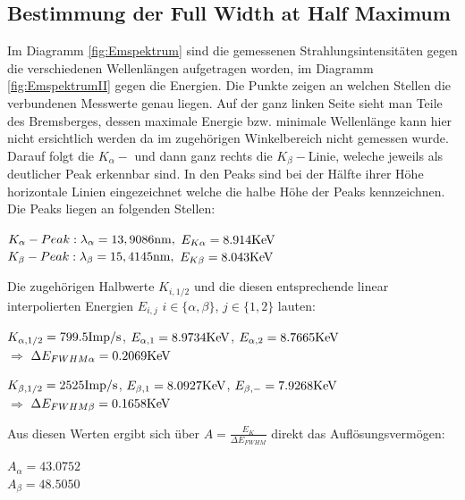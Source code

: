 \subsection{Bestimmung der Full Width at Half Maximum}
Im Diagramm \autoref{fig:Emspektrum} sind die gemessenen Strahlungsintensitäten gegen die 
verschiedenen Wellenlängen aufgetragen worden, im Diagramm \autoref{fig:EmspektrumII} gegen die Energien.
Die Punkte zeigen an welchen Stellen die verbundenen Messwerte genau liegen. Auf der ganz linken Seite sieht man Teile des Bremsberges, dessen 
maximale Energie bzw. minimale Wellenlänge kann hier nicht ersichtlich werden da im zugehörigen Winkelbereich nicht 
gemessen wurde. Darauf folgt die $K_\alpha-$ und dann ganz rechts die $K_\beta-$Linie, weleche jeweils als deutlicher
Peak erkennbar sind. In den Peaks sind bei der Hälfte ihrer Höhe horizontale Linien eingezeichnet welche die halbe
Höhe der Peaks kennzeichnen. Die Peaks liegen an folgenden Stellen:
\begin{center}
  $K_\alpha -Peak: \lambda_\alpha=13,9086\si[]{nm},$  $E_{K\alpha}=8.914\si[]{KeV}$\\
  $K_\beta -Peak:  \lambda_\beta=15,4145\si[]{nm},$  $E_{K\beta}=8.043\si[]{KeV}$
\end{center} 
Die zugehörigen Halbwerte $K_{i,1/2}$ und die diesen entsprechende linear interpolierten Energien $E_{i,j}$ $i\in\{\alpha,\beta\}$, $j\in\{1,2\}$
lauten:
\begin{center}
  $K_{\alpha,1/2}=799.5\si[]{Imp/s}$, $E_{\alpha,1}=8.9734\si[]{KeV}$, $E_{\alpha,2}=8.7665\si[]{KeV}$\\
  $\Rightarrow$ $\Delta E_{FWHM\alpha}=0.2069\si[]{KeV}$
\end{center}
\begin{center}
  $K_{\beta,1/2}=2525\si[]{Imp/s}$, $E_{\beta,1}=8.0927\si[]{KeV}$, $E_{\beta,-}=7.9268\si[]{KeV}$\\
  $\Rightarrow$ $\Delta E_{FWHM\beta}=0.1658\si[]{KeV}$
\end{center}
Aus diesen Werten ergibt sich über $A=\frac{E_K}{\Delta E_{FWHM}}$ direkt das Auflösungsvermögen:
\begin{center}
  $A_\alpha=43.0752$\\
  $A_\beta=48.5050$
\end{center}


